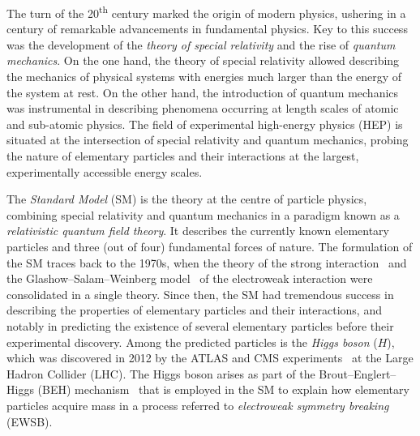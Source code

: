 The turn of the 20\textsuperscript{th} century marked the origin of modern
physics, ushering in a century of remarkable advancements in fundamental
physics. Key to this success was the development of the \emph{theory of special
  relativity} and the rise of \emph{quantum mechanics}. On the one hand, the
theory of special relativity
%
allowed describing the mechanics of physical systems with energies much larger
than the energy of the system at rest. On the other hand, the introduction of
quantum mechanics was instrumental in describing phenomena occurring at length
scales of atomic and sub-atomic physics. The field of experimental high-energy
physics (HEP) is situated at the intersection of special relativity and quantum
mechanics, probing the nature of elementary particles and their interactions at
the largest, experimentally accessible energy scales.



The \emph{Standard Model} (SM) is the theory at the centre of particle physics,
combining special relativity and quantum mechanics in a paradigm known as a
\emph{relativistic quantum field theory}. It describes the currently known
elementary particles and three (out of four) fundamental forces of nature. The
formulation of the SM traces back to the 1970s, when the theory of the strong
interaction~\cite{Fritzsch:1973pi,Gross:1973id,Politzer:1973fx} and the
Glashow--Salam--Weinberg
model~\cite{Glashow:1961tr,Salam:1964ry,Weinberg:1967tq} of the electroweak
interaction were consolidated in a single theory. Since then, the SM had
tremendous success in describing the properties of elementary particles and
their interactions, and notably in predicting the existence of several
elementary particles before their experimental discovery. Among the predicted
particles is the \emph{Higgs boson} ($H$), which was discovered in 2012 by the
ATLAS and CMS experiments~\cite{HIGG-2012-27,CMS-HIG-12-028} at the Large Hadron
Collider (LHC). The Higgs boson arises as part of the Brout--Englert--Higgs
(BEH) mechanism~\cite{Englert:1964et,Higgs:1964pj} that is employed in the SM to
explain how elementary particles acquire mass in a process referred to
\emph{electroweak symmetry breaking} (EWSB).


